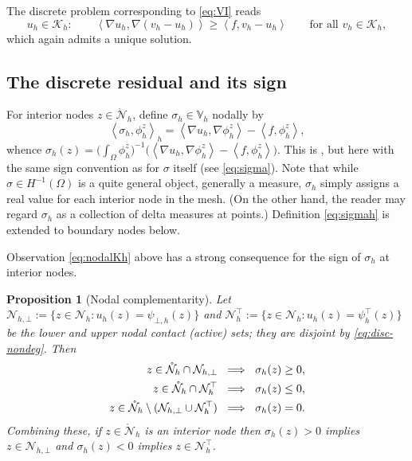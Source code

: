 \documentclass[12pt]{amsart}
\newtheorem{proposition}{Proposition}
\theoremstyle{definition}
\newcommand{\Om}{\Omega}
\newcommand{\psiloh}{\psi_{\bot,h}}
\newcommand{\psiuph}{\psi^\top_h}
\newcommand{\Vh}{\mathbb{V}_h}
\newcommand{\Nh}{\mathcal{N}_h}
\newcommand{\Nhr}{\mathring{\mathcal{N}}_h}
\newcommand{\Kh}{\mathcal{K}_h}
\newcommand{\Nhbot}{\mathcal{N}_{h,\bot}}
\newcommand{\Nhtop}{\Nh^\top}
\begin{document}
The discrete problem corresponding to \eqref{eq:VI} reads
\begin{equation}
\label{eq:discVI}
  u_h \in \Kh: \qquad
  \left< \nabla u_h, \nabla(v_h - u_h)\right> \ge \left< f, v_h - u_h\right>
  \qquad \text{for all } v_h \in \Kh,
\end{equation}
which again admits a unique solution.


\subsection{The discrete residual and its sign}

For interior nodes $z \in \Nhr$, define $\sigma_h \in \Vh$ nodally by
\begin{equation}
\label{eq:sigmah}
  \left< \sigma_h, \phi_h^z \right>_h
  = \left< \nabla u_h, \nabla \phi_h^z \right> - \left< f, \phi_h^z \right>,
\end{equation}
whence $\sigma_h(z) = \bigl(\int_\Om \phi_h^z\bigr)^{-1}
\bigl(\left< \nabla u_h, \nabla \phi_h^z\right> - \left< f, \phi_h^z\right>\bigr)$.  This is \cite[formula (2.1)]{NSV03}, but here with the same sign convention as for $\sigma$ itself (see \eqref{eq:sigma}).  Note that while $\sigma \in H^{-1}(\Om)$ is a quite general object, generally a measure, $\sigma_h$ simply assigns a real value for each interior node in the mesh.  (On the other hand, the reader may regard $\sigma_h$ as a collection of delta measures at points.)  Definition \eqref{eq:sigmah} is extended to boundary nodes below.

Observation \eqref{eq:nodalKh} above has a strong consequence for the sign of $\sigma_h$ at interior nodes.

\begin{proposition}[Nodal complementarity]
\label{prop:nodalsign}  Let $\Nhbot := \{z \in \Nh : u_h(z) = \psiloh(z)\}$ and $\Nhtop := \{z \in \Nh : u_h(z) = \psiuph(z)\}$ be the lower and upper \emph{nodal contact (active) sets}; they are disjoint by \eqref{eq:disc-nondeg}.  Then
\begin{align}
\label{eq:nodalcomp}
  z \in \Nhr \cap \Nhbot \ &\implies\ \sigma_h(z) \ge 0, \\
  z \in \Nhr \cap \Nhtop \ &\implies\ \sigma_h(z) \le 0, \notag \\
  z \in \Nhr \setminus (\Nhbot \cup \Nhtop) \ &\implies\ \sigma_h(z) = 0. \notag
\end{align}
Combining these, if $z \in \Nhr$ is an interior node then $\sigma_h(z) > 0$ implies $z \in \Nhbot$ and $\sigma_h(z) < 0$ implies $z \in \Nhtop$.
\end{proposition}
\end{document}
